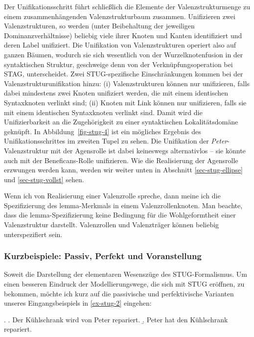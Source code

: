 Der Unifikationsschritt führt schlie\ss lich die Elemente der Valenzstrukturmenge zu einem zusammenhängenden Valenzstrukturbaum zusammen. Unifizieren zwei Valenzstrukturen, so werden (unter Beibehaltung der jeweiligen Dominanzverhältnisse) beliebig viele ihrer Knoten und Kanten identifiziert und deren Label unifiziert. Die Unifikation von Valenzstrukturen operiert also auf ganzen Bäumen, wodurch sie sich wesentlich von der Wurzelknotenfusion in der syntaktischen Struktur, geschweige denn von der Verknüpfungsoperation bei STAG, unterscheidet. Zwei STUG-spezifische Einschränkungen kommen bei der Valenzstrukturunifikation hinzu: (i) Valenzstrukturen können nur unifizieren, falls dabei mindestens zwei Knoten unifiziert werden, die mit einem identischen Syntaxknoten verlinkt sind; (ii) Knoten mit Link können nur unifizieren, falls sie mit einem identischen Syntaxknoten verlinkt sind. Damit wird die Unifizierbarkeit an die Zugehörigkeit zu einer syntaktischen Lokalitätsdomäne geknüpft. In Abbildung~\ref{fig-stug-4} ist ein mögliches Ergebnis des Unifikationsschrittes im zweiten Tupel zu sehen. Die Unifikation der {\it Peter}-Valenzstruktur mit der Agensrolle ist dabei keineswegs alternativlos -- sie könnte auch mit der Beneficans-Rolle unifizieren. Wie die Realisierung der Agensrolle erzwungen werden kann, werden wir weiter unten in Abschnitt \ref{sec-stug-ellipse} und \ref{sec-stug-vollst} sehen.


\clearpage 

Wenn ich von Realisierung einer Valenzrolle spreche, dann meine ich die Spezifizierung des {\sc lemma}-Merkmals in einem Valenzrollenknoten. Man beachte, dass die {\sc lemma}-Spezifizie\-rung keine Bedingung für die Wohlgeformtheit einer Valenzstruktur darstellt. Valenzrollen und Valenzträger können beliebig unterspezifiert sein.



\subsubsection*{Kurzbeispiele: Passiv, Perfekt und Voranstellung}

Soweit die Darstellung der elementaren Wesenszüge des STUG-Formalismus. Um einen besseren Eindruck der Modellierungswege, die sich mit STUG eröffnen, zu bekommen, möchte ich kurz auf die passivische und perfektivische Varianten unseres Eingangsbeispiels in \ref{ex-stug-2} eingehen:

\ex. \label{ex-stug-2}
\a.  \label{ex-stug-2-a} Der Kühlschrank wird von Peter repariert.
\b. \label{ex-stug-2-b} Peter hat den Kühlschrank repariert.

